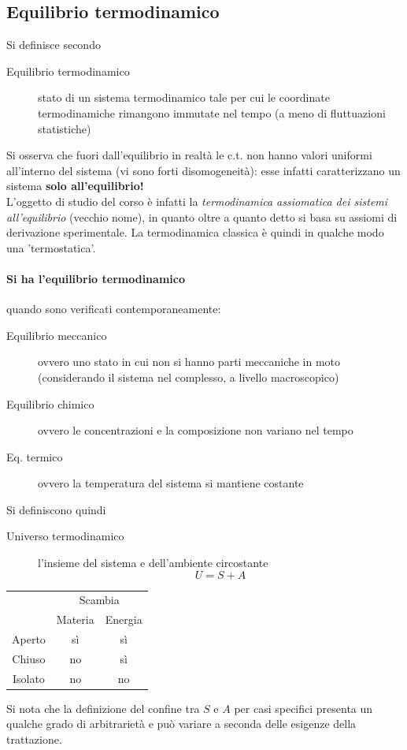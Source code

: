 \documentclass[10pt, oneside]{book}
\begin{document}
\subsection{Equilibrio termodinamico}
Si definisce secondo
\begin{description}
\item[Equilibrio termodinamico] stato di un sistema termodinamico tale per cui le coordinate termodinamiche rimangono immutate nel tempo (a meno di fluttuazioni statistiche)
\end{description}
Si osserva che fuori dall'equilibrio in realtà le c.t. non hanno valori uniformi all'interno del sistema (vi sono forti disomogeneità): esse infatti caratterizzano un sistema \textbf{solo all'equilibrio!}
\\L'oggetto di studio del corso è infatti la \textit{termodinamica assiomatica dei sistemi all'equilibrio} (vecchio nome), in quanto oltre a quanto detto si basa su assiomi di derivazione sperimentale. La termodinamica classica è quindi in qualche modo una 'termostatica'.
\paragraph{Si ha l'equilibrio termodinamico} quando sono verificati contemporaneamente:
\begin{description}
\item[Equilibrio meccanico] ovvero uno stato in cui non si hanno parti meccaniche in moto (considerando il sistema nel complesso, a livello macroscopico)
\item[Equilibrio chimico] ovvero le concentrazioni e la composizione non variano nel tempo
\item[Eq. termico] ovvero la temperatura del sistema si mantiene costante
\end{description}

Si definiscono quindi
\begin{description}
\item[Universo termodinamico] l'insieme del sistema e dell'ambiente circostante
\[U = S + A\]
\end{description}
\begin{center}

\begin{tabular}{c|c c}
& \multicolumn{2}{c}{Scambia}\\
& Materia & Energia\\\hline
Aperto & sì & sì\\
Chiuso & no & sì\\
Isolato & no & no

\end{tabular}

\end{center}
Si nota che la definizione del confine tra $S$ e $A$ per casi specifici presenta un qualche grado di arbitrarietà e può variare a seconda delle esigenze della trattazione.
\end{document}
